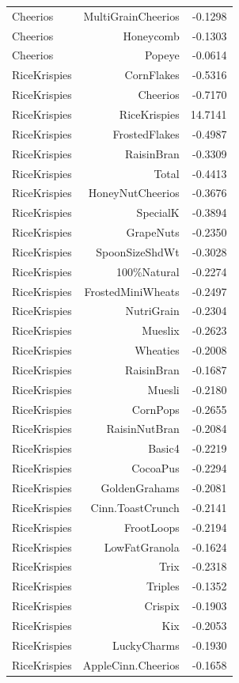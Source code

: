 \begin{longtable}{@{}lrr@{}}
Cheerios & MultiGrainCheerios & -0.1298 \\
Cheerios & Honeycomb & -0.1303 \\
Cheerios & Popeye & -0.0614 \\
RiceKrispies & CornFlakes & -0.5316 \\
RiceKrispies & Cheerios & -0.7170 \\
RiceKrispies & RiceKrispies & 14.7141 \\
RiceKrispies & FrostedFlakes & -0.4987 \\
RiceKrispies & RaisinBran & -0.3309 \\
RiceKrispies & Total & -0.4413 \\
RiceKrispies & HoneyNutCheerios & -0.3676 \\
RiceKrispies & SpecialK & -0.3894 \\
RiceKrispies & GrapeNuts & -0.2350 \\
RiceKrispies & SpoonSizeShdWt & -0.3028 \\
RiceKrispies & 100\%Natural & -0.2274 \\
RiceKrispies & FrostedMiniWheats & -0.2497 \\
RiceKrispies & NutriGrain & -0.2304 \\
RiceKrispies & Mueslix & -0.2623 \\
RiceKrispies & Wheaties & -0.2008 \\
RiceKrispies & RaisinBran & -0.1687 \\
RiceKrispies & Muesli & -0.2180 \\
RiceKrispies & CornPops & -0.2655 \\
RiceKrispies & RaisinNutBran & -0.2084 \\
RiceKrispies & Basic4 & -0.2219 \\
RiceKrispies & CocoaPus & -0.2294 \\
RiceKrispies & GoldenGrahams & -0.2081 \\
RiceKrispies & Cinn.ToastCrunch & -0.2141 \\
RiceKrispies & FrootLoops & -0.2194 \\
RiceKrispies & LowFatGranola & -0.1624 \\
RiceKrispies & Trix & -0.2318 \\
RiceKrispies & Triples & -0.1352 \\
RiceKrispies & Crispix & -0.1903 \\
RiceKrispies & Kix & -0.2053 \\
RiceKrispies & LuckyCharms & -0.1930 \\
RiceKrispies & AppleCinn.Cheerios & -0.1658 \\

\end{longtable}
